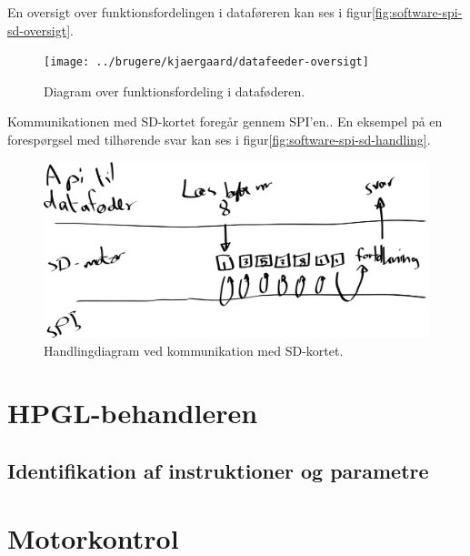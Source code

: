 En oversigt over funktionsfordelingen i
dataføreren kan ses i
figur\vref{fig:software-spi-sd-oversigt}.

\begin{figure}[htbp]
  \centering
  \texttt{[image: ../brugere/kjaergaard/datafeeder-oversigt]}
  \caption{Diagram over funktionsfordeling i dataføderen.}
  \label{fig:software-spi-sd-oversigt}
\end{figure}

Kommunikationen med SD-kortet foregår gennem SPI'en.. En eksempel på en forespørgsel med tilhørende svar
kan ses i figur\vref{fig:software-spi-sd-handling}.

\begin{figure}[htbp]
  \centering
  \includegraphics[width=\textwidth]{../brugere/kjaergaard/datafeeder-handling}
  \caption{Handlingdiagram ved kommunikation med SD-kortet.}
  \label{fig:software-spi-sd-handling}
\end{figure}


\section{HPGL-behandleren}



\subsection{Identifikation af instruktioner og parametre}



\section[Motorkontrol (med buffer)]{Motorkontrol}

